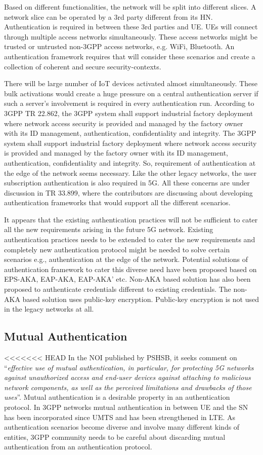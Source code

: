 \documentclass[12pt]{llncs}
\newcommand\ques[1]{``\emph{#1}''}
\begin{document}
Based on different functionalities, the network will be split into different slices. A network slice can be operated by a 3rd party different from its HN. Authentication is required in between these 3rd parties and UE. UEs will connect through multiple access networks simultaneously. These access networks might be trusted or untrusted non-3GPP access networks, e.g. WiFi, Bluetooth. An authentication framework requires that will consider these scenarios and create a collection of coherent and secure security-contexts.

There will be large number of IoT devices activated almost simultaneously. These bulk activations would create a huge pressure on a central authentication server if such a server's involvement is required in every authentication run. According to 3GPP TR 22.862, the 3GPP system shall support industrial factory deployment where network access security is provided and managed by the factory owner with its ID management, authentication, confidentiality and integrity. The 3GPP system shall support industrial factory deployment where network access security is provided and managed
by the factory owner with its ID management, authentication, confidentiality and integrity. So, requirement of authentication at the edge of the network seems necessary. Like the other legacy networks, the user subscription authentication is also required in 5G. All these concerns are under discussion in TR 33.899, where the contributors are discussing about developing authentication frameworks that would support all the different scenarios. 

It appears that the existing authentication practices will not be sufficient to cater all the new requirements arising in the future 5G network. Existing authentication practices needs to be extended to cater the new requirements and completely new authentication protocol might be needed to solve certain scenarios e.g., authentication at the edge of the network. Potential solutions of authentication framework to cater this diverse need have been proposed based on EPS-AKA, EAP-AKA, EAP-AKA' etc. Non-AKA based solution has also been proposed to authenticate credentials different to existing credentials. The non-AKA based solution uses public-key encryption. Public-key encryption is not used in the legacy networks at all.  

\subsection{Mutual Authentication}
<<<<<<< HEAD
In the NOI published by PSHSB, it seeks comment on \ques{effective use of mutual authentication, in particular, for protecting 5G networks against unauthorized access and end-user devices against attaching to malicious network components, as well as the perceived limitations and drawbacks of those uses}. Mutual authentication is a desirable property in an authentication protocol. In 3GPP networks mutual authentication in between UE and the SN has been incorporated since UMTS and has been strengthened in LTE. As authentication scenarios become diverse and involve many different kinds of entities, 3GPP community needs to be careful about discarding mutual authentication from an authentication protocol. 
\end{document}
